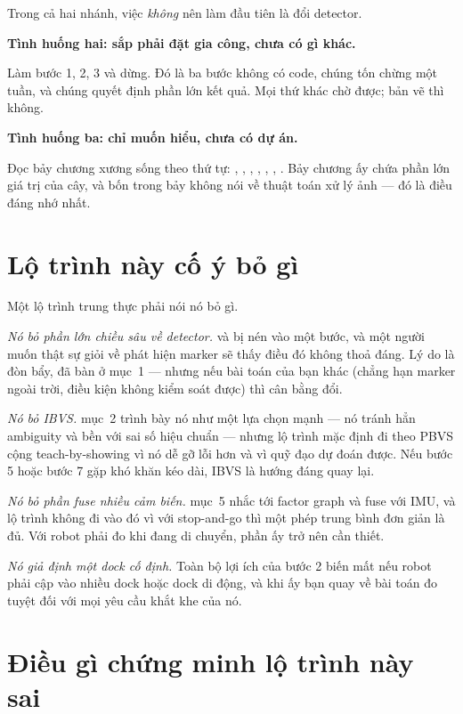 \documentclass[../../marker.tex]{subfiles}
\begin{document}
Trong cả hai nhánh, việc \emph{không} nên làm đầu tiên là đổi detector.

\textbf{Tình huống hai: sắp phải đặt gia công, chưa có gì khác.}

Làm bước 1, 2, 3 và dừng. Đó là ba bước không có code, chúng tốn chừng một tuần, và chúng quyết định phần lớn kết quả. Mọi thứ khác chờ được; bản vẽ thì không.

\textbf{Tình huống ba: chỉ muốn hiểu, chưa có dự án.}

Đọc bảy chương xương sống theo thứ tự: , , , , , , . Bảy chương ấy chứa phần lớn giá trị của cây, và bốn trong bảy không nói về thuật toán xử lý ảnh --- đó là điều đáng nhớ nhất.

\section{Lộ trình này cố ý bỏ gì}

Một lộ trình trung thực phải nói nó bỏ gì.

\emph{Nó bỏ phần lớn chiều sâu về detector.}  và  bị nén vào một bước, và một người muốn thật sự giỏi về phát hiện marker sẽ thấy điều đó không thoả đáng. Lý do là đòn bẩy, đã bàn ở mục~1 --- nhưng nếu bài toán của bạn khác (chẳng hạn marker ngoài trời, điều kiện không kiểm soát được) thì cân bằng đổi.

\emph{Nó bỏ IBVS.}  mục~2 trình bày nó như một lựa chọn mạnh --- nó tránh hẳn ambiguity và bền với sai số hiệu chuẩn --- nhưng lộ trình mặc định đi theo PBVS cộng teach-by-showing vì nó dễ gỡ lỗi hơn và vì quỹ đạo dự đoán được. Nếu bước 5 hoặc bước 7 gặp khó khăn kéo dài, IBVS là hướng đáng quay lại.

\emph{Nó bỏ phần fuse nhiều cảm biến.}  mục~5 nhắc tới factor graph và fuse với IMU, và lộ trình không đi vào đó vì với stop-and-go thì một phép trung bình đơn giản là đủ. Với robot phải đo khi đang di chuyển, phần ấy trở nên cần thiết.

\emph{Nó giả định một dock cố định.} Toàn bộ lợi ích của bước 2 biến mất nếu robot phải cập vào nhiều dock hoặc dock di động, và khi ấy bạn quay về bài toán đo tuyệt đối với mọi yêu cầu khắt khe của nó.

\section{Điều gì chứng minh lộ trình này sai}
\end{document}
